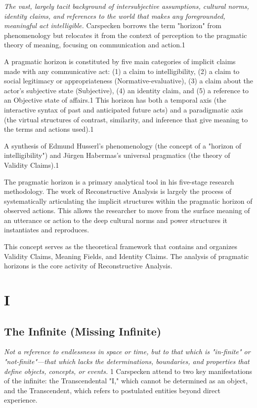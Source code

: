\documentclass{book}
\begin{document}
\textit{The vast, largely tacit background of intersubjective assumptions, cultural norms, identity claims, and references to the world that makes any foregrounded, meaningful act intelligible.} Carspecken borrows the term "horizon" from phenomenology but relocates it from the context of perception to the pragmatic theory of meaning, focusing on communication and action.1

A pragmatic horizon is constituted by five main categories of implicit claims made with any communicative act: (1) a claim to intelligibility, (2) a claim to social legitimacy or appropriateness (Normative-evaluative), (3) a claim about the actor's subjective state (Subjective), (4) an identity claim, and (5) a reference to an Objective state of affairs.1 This horizon has both a temporal axis (the interactive syntax of past and anticipated future acts) and a paradigmatic axis (the virtual structures of contrast, similarity, and inference that give meaning to the terms and actions used).1

A synthesis of Edmund Husserl's phenomenology (the concept of a "horizon of intelligibility") and Jürgen Habermas's universal pragmatics (the theory of Validity Claims).1

The pragmatic horizon is a primary analytical tool in his five-stage research methodology. The work of Reconstructive Analysis is largely the process of systematically articulating the implicit structures within the pragmatic horizon of observed actions. This allows the researcher to move from the surface meaning of an utterance or action to the deep cultural norms and power structures it instantiates and reproduces.

This concept serves as the theoretical framework that contains and organizes Validity Claims, Meaning Fields, and Identity Claims. The analysis of pragmatic horizons is the core activity of Reconstructive Analysis.

\parencite{Carspecken1995aa}




\chapter{I}

\section{The Infinite (Missing Infinite)}

\textit{Not a reference to endlessness in space or time, but to that which is "in-finite" or "not-finite"—that which lacks the determinations, boundaries, and properties that define objects, concepts, or events.} 1 Carspecken attend to two key manifestations of the infinite: the Transcendental "I," which cannot be determined as an object, and the Transcendent, which refers to postulated entities beyond direct experience.
\end{document}
